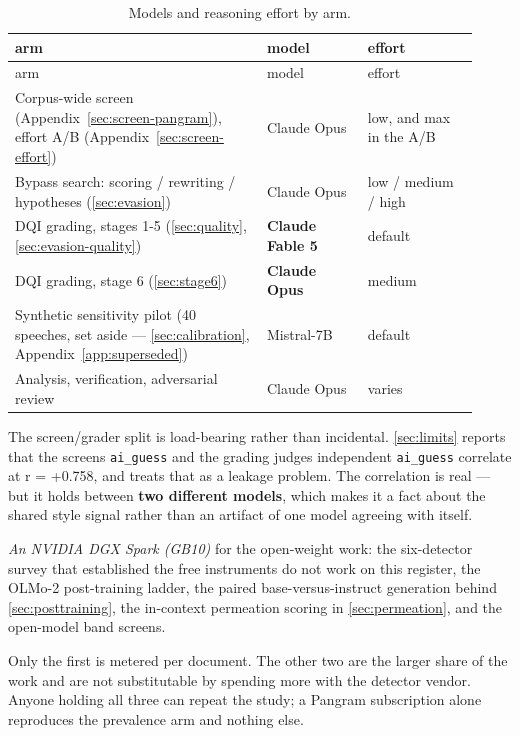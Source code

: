 \begingroup\small
\begin{longtable}[]{@{}p{0.50\linewidth}p{0.20\linewidth}p{0.22\linewidth}@{}}
\caption{Models and reasoning effort by arm.}\label{tab:models}\\
\toprule\noalign{}
arm & model & effort \\
\midrule\noalign{}
\endfirsthead
\toprule\noalign{}
arm & model & effort \\
\midrule\noalign{}
\endhead
\bottomrule\noalign{}
\endlastfoot
Corpus-wide screen (Appendix~\ref{sec:screen-pangram}), effort A/B (Appendix~\ref{sec:screen-effort}) & Claude Opus & low, and max in the A/B \\
Bypass search: scoring / rewriting / hypotheses (\cref{sec:evasion}) & Claude Opus & low / medium / high \\
DQI grading, stages 1-5 (\cref{sec:quality}, \cref{sec:evasion-quality}) & \textbf{Claude Fable 5} & default \\
DQI grading, stage 6 (\cref{sec:stage6}) & \textbf{Claude Opus} & medium \\
Synthetic sensitivity pilot (40 speeches, set aside --- \cref{sec:calibration}, Appendix~\ref{app:superseded}) & Mistral-7B & default \\
Analysis, verification, adversarial review & Claude Opus & varies \\
\end{longtable}
\endgroup

The screen/grader split is load-bearing rather than incidental. \cref{sec:limits} reports
that the screen\textquotesingle s \texttt{ai\_guess} and the grading judge\textquotesingle s independent \texttt{ai\_guess}
correlate at r = +0.758, and treats that as a leakage problem. The correlation
is real --- but it holds between \textbf{two different models}, which makes it a fact
about the shared style signal rather than an artifact of one model agreeing
with itself.

\emph{An NVIDIA DGX Spark (GB10)} for the open-weight work: the six-detector survey
that established the free instruments do not work on this register, the OLMo-2
post-training ladder, the paired base-versus-instruct generation behind \cref{sec:posttraining},
the in-context permeation scoring in \cref{sec:permeation}, and the open-model band screens.

Only the first is metered per document. The other two are the larger share of
the work and are not substitutable by spending more with the detector vendor.
Anyone holding all three can repeat the study; a Pangram subscription alone
reproduces the prevalence arm and nothing else.

